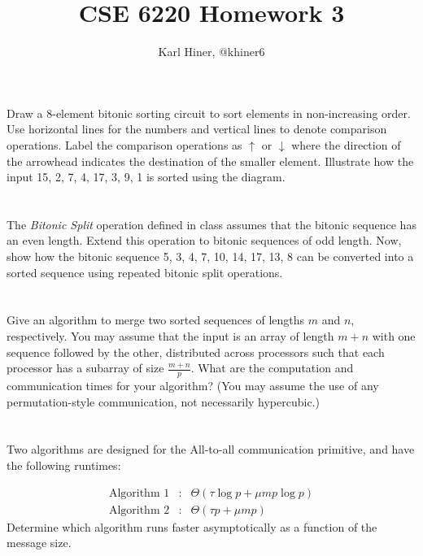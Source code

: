 \documentclass{article}
\newcommand{\aln}[1]{\begin{align*}#1\end{align*}}
\begin{document}
\title{CSE 6220 Homework 3}
\author{Karl Hiner, @khiner6}
\date{}
\maketitle

\section{}
Draw a 8-element bitonic sorting circuit to sort elements in non-increasing order.
Use horizontal lines for the numbers and vertical lines to denote comparison operations.
Label the comparison operations as $\uparrow$ or $\downarrow$ where the direction of the arrowhead indicates
the destination of the smaller element.
Illustrate how the input 15, 2, 7, 4, 17, 3, 9, 1 is sorted using the diagram.

\section{}
The \textit{Bitonic Split} operation defined in class assumes that the bitonic sequence has
an even length.
Extend this operation to bitonic sequences of odd length.
Now, show how the bitonic sequence 5, 3, 4, 7, 10, 14, 17, 13, 8 can be converted into a sorted sequence using
repeated bitonic split operations.

\section{}
Give an algorithm to merge two sorted sequences of lengths $m$ and $n$, respectively.
You may assume that the input is an array of length $m+n$ with one sequence followed by the other, distributed across processors such that each processor has a subarray of size $\frac{m+n}{p}$.
What are the computation and communication times for your algorithm?
(You may assume the use of any permutation-style communication, not necessarily hypercubic.)

\section{}
Two algorithms are designed for the All-to-all communication primitive, and have
the following runtimes:

\aln{
  \text{Algorithm 1} &:&\Theta\left(\tau\log{p} + \mu m p \log{p}\right)\\
  \text{Algorithm 2} &:&\Theta\left(\tau p + \mu m p\right)
}
Determine which algorithm runs faster asymptotically as a function of the message size.
\end{document}
